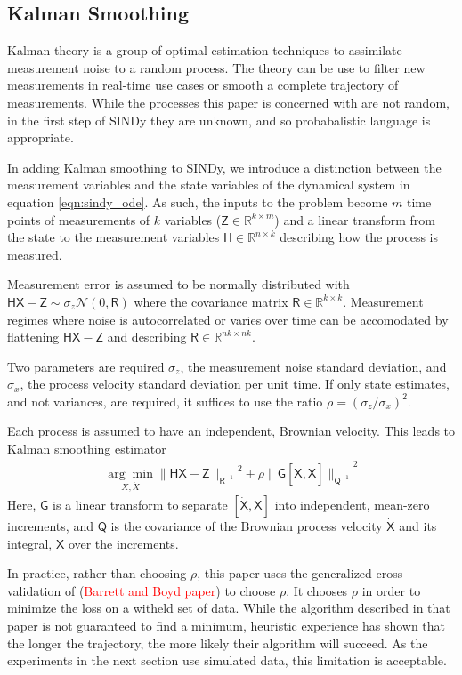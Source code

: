 \documentclass{article}
\newcommand{\red}[1]{\textcolor{red}{#1}}
\newcommand{\mat}[1]{\boldsymbol{\mathsf{#1}}}
\newcommand{\R}[1]{\mathbb{R}^{#1}}
\begin{document}
\subsection{Kalman Smoothing}

Kalman theory is a group of optimal estimation techniques to assimilate measurement noise to a random process.  The theory can be use to filter new measurements in real-time use cases or smooth a complete trajectory of measurements.  While the processes this paper is concerned with are not random, in the first step of SINDy they are unknown, and so probabalistic language is appropriate.


In adding Kalman smoothing to SINDy, we introduce a distinction between the measurement variables and the state variables of the dynamical system in equation 
\ref{eqn:sindy_ode}.  As such, the inputs to the problem become $m$ time points of measurements of $k$ variables ($\mat Z\in \R{k\times m}$) and a linear transform from the state to the measurement variables $\mat H \in \R{n \times k}$ describing how the process is measured.

Measurement error is assumed to be normally distributed with $\mat H \mat X - \mat Z \sim \sigma_z \mathcal N(0, \mat R)$ where the covariance matrix $\mat R\in\R{k \times k}$.  Measurement regimes where noise is autocorrelated or varies over time can be accomodated by flattening $\mat H \mat X - \mat Z$ and describing $\mat R\in\R{nk \times nk}$.

Two parameters are required $\sigma_z$, the measurement noise standard deviation, and $\sigma_x$, the process velocity standard deviation per unit time.  If only state estimates, and not variances, are required, it suffices to use the ratio $\rho = (\sigma_z / \sigma_x)^2$.

Each process is assumed to have an independent, Brownian velocity.  This leads to Kalman smoothing estimator 
\begin{align}
    \underset{X, \dot X}{\arg\min}{\|\mat H \mat X - \mat Z\|_{\mat R^{-1}}}^2 + \rho {\|\mat G [\mat {\dot X}, \mat X]\|_{\mat Q^{-1}}}^2
\end{align}
Here, $\mat G$ is a linear transform to separate $[\mat{\dot X}, \mat X]$ into independent, mean-zero increments, and $\mat Q$ is the covariance of the Brownian process velocity $\mat{\dot X}$ and its integral, $\mat X$ over the increments.

In practice, rather than choosing $\rho$, this paper uses the generalized cross validation of (\red{Barrett and Boyd paper}) to choose $\rho$.  It chooses $\rho$ in order to minimize the loss on a witheld set of data.  While the algorithm described in that paper is not guaranteed to find a minimum, heuristic experience has shown that the longer the trajectory, the more likely their algorithm will succeed.  As the experiments in the next section use simulated data, this limitation is acceptable.
\end{document}
